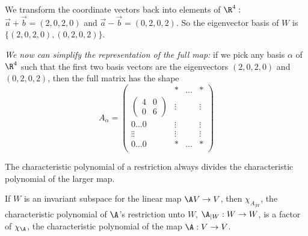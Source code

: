 \begin{example}
    We transform the coordinate vectors back into elements of $\R^4:$ $\vec{a} + \vec{b} = (2,0,2,0)$ and $\vec{a} - \vec{b} = (0,2,0,2)$.
    So the eigenvector basis of $W$ is $\{(2,0,2,0), (0,2,0,2)\}$.

    \emph{We now can simplify the representation of the full map:} if we pick any basis $\alpha$ of $\R^4$ such that the first two basis vectors
    are the eigenvectors $(2,0,2,0)$ and $(0,2,0,2)$, then the full matrix has the shape
    $$A_\alpha = \begin{pmatrix}
                                                      & * & \dots & * \\
         \begin{pmatrix} 4 & 0 \\ 0 & 6\end{pmatrix}  & \vdots & & \vdots \\
        0  \dots  0 & \vdots & & \vdots \\
           \vdots\vdots & \vdots & & \vdots \\
        0  \dots  0 & * & \dots & * \\
    \end{pmatrix}$$
\end{example}

\begin{remark}
    The characteristic polynomial of a restriction always divides the characteristic polynomial of the larger map.
\end{remark}

\begin{theorem}
    If $W$ is an invariant subspace for the linear map $\A V \to V$, then $\chi_{A_{|W}}$, the characteristic polynomial of $\A$'s restriction unto
    $W$, $\A_{|W}: W \to W$, is a factor of $\chi_\A$, the characteristic polynomial of the map $\A: V \to V$.
\end{theorem}

